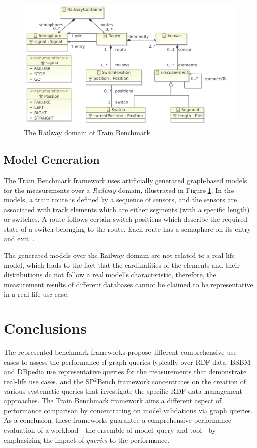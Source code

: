 \begin{figure}[!ht]
	\centering
	\includegraphics[width=150mm, keepaspectratio]{figures/railway-containments.pdf}
	\caption{The Railway domain of Train Benchmark.}
	\label{fig:tb_domain}
\end{figure}

\subsection{Model Generation}

The Train Benchmark framework uses artificially generated graph-based models for the measurements over a \textit{Railway} domain, illustrated in Figure \ref{fig:tb_domain}. In the models, a train route is defined by a sequence of sensors, and the sensors are associated with track elements which are either segments (with a specific length) or switches. A route follows certain switch positions which describe the required state of a switch belonging to the route. Each route has a semaphore on its entry and exit~\cite{train_ttc}.

The generated models over the Railway domain are not related to a real-life model, which leads to the fact that the cardinalities of the elements and their distributions do not follow a real model's characteristic, therefore, the measurement results of different databases cannot be claimed to be representative in a real-life use case.

\section{Conclusions} \label{sec:benchmark_conclusions}

The represented benchmark frameworks propose different comprehensive use cases to assess the performance of graph queries typically over RDF data. BSBM and DBpedia use representative queries for the measurements that demonstrate real-life use cases, and the SP$^2$Bench framework concentrates on the creation of various systematic queries that investigate the specific RDF data management approaches. The Train Benchmark framework aims a different aspect of performance comparison by concentrating on model validations via graph queries. As a conclusion, these frameworks guarantee a comprehensive performance evaluation of a workload---the ensemble of model, query and tool---by emphasizing the impact of \textit{queries} to the performance.

